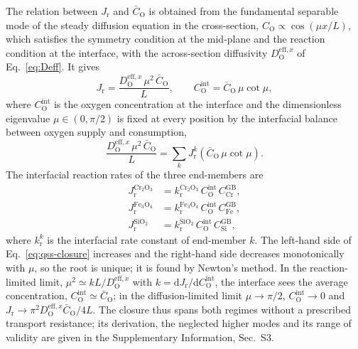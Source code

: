 \documentclass[3p,times]{elsarticle} %
\newcommand{\GB}{\mathrm{GB}}
\newcommand{\eff}{\mathrm{eff}}
\newcommand{\intf}{\mathrm{int}}       %
\newcommand{\Ox}{\mathrm{O}}           %
\begin{document}
The relation between \(J_{\mathrm{r}}\) and \(\bar{C}_{\Ox}\) is obtained from
the fundamental separable mode of the steady diffusion equation in the
cross-section, \(C_{\Ox}\propto\cos(\mu x/L)\), which satisfies the symmetry
condition at the mid-plane and the reaction condition at the interface, with
the across-section diffusivity \(D_{\Ox}^{\eff,x}\) of Eq.~\eqref{eq:Deff}. It
gives
\begin{equation}
J_{\mathrm{r}}=\frac{D_{\Ox}^{\eff,x}\,\mu^{2}\,\bar{C}_{\Ox}}{L},
\qquad
C_{\Ox}^{\intf}=\bar{C}_{\Ox}\,\mu\cot\mu ,
\label{eq:film-transport}
\end{equation}
where \(C_{\Ox}^{\intf}\) is the oxygen concentration at the interface and the
dimensionless eigenvalue \(\mu\in(0,\pi/2)\) is fixed at every position by the
interfacial balance between oxygen supply and consumption,
\begin{equation}
\frac{D_{\Ox}^{\eff,x}\,\mu^{2}\,\bar{C}_{\Ox}}{L}
=\sum_k J_{\mathrm{r}}^{k}\!\left(\bar{C}_{\Ox}\,\mu\cot\mu\right).
\label{eq:qss-closure}
\end{equation}
The interfacial reaction rates of the three end-members are
\begin{align}
J_{\mathrm{r}}^{\mathrm{Cr_2O_3}}
 &= k_{\mathrm{r}}^{\mathrm{Cr_2O_3}}\,
    C_{\Ox}^{\intf}\,C_{\mathrm{Cr}}^{\GB},
\label{eq:rate-cr2o3}\\
J_{\mathrm{r}}^{\mathrm{Fe_3O_4}}
 &= k_{\mathrm{r}}^{\mathrm{Fe_3O_4}}\,
    C_{\Ox}^{\intf}\,C_{\mathrm{Fe}}^{\GB},
\label{eq:rate-fe3o4}\\
J_{\mathrm{r}}^{\mathrm{SiO_2}}
 &= k_{\mathrm{r}}^{\mathrm{SiO_2}}\,
    C_{\Ox}^{\intf}\,C_{\mathrm{Si}}^{\GB},
\label{eq:rate-sio2}
\end{align}
where \(k_{\mathrm{r}}^{k}\) is the interfacial rate constant of end-member
\(k\).
The left-hand side of Eq.~\eqref{eq:qss-closure} increases and the right-hand
side decreases monotonically with \(\mu\), so the root is unique; it is found by
Newton's method. In the reaction-limited limit,
\(\mu^{2}\simeq k L/D_{\Ox}^{\eff,x}\) with
\(k=\mathrm{d}J_{\mathrm{r}}/\mathrm{d}C_{\Ox}^{\intf}\), the interface sees the
average concentration, \(C_{\Ox}^{\intf}\simeq\bar{C}_{\Ox}\); in the
diffusion-limited limit \(\mu\to\pi/2\), \(C_{\Ox}^{\intf}\to0\) and
\(J_{\mathrm{r}}\to\pi^{2}D_{\Ox}^{\eff,x}\bar{C}_{\Ox}/4L\). The closure thus
spans both regimes without a prescribed transport resistance; its derivation,
the neglected higher modes and its range of validity are given in the
Supplementary Information, Sec.~S3.
\end{document}
